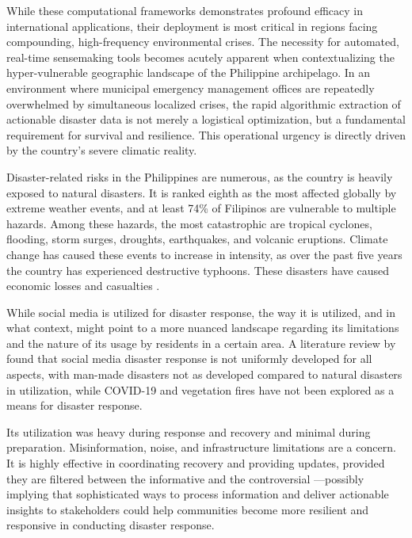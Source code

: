 While these computational frameworks demonstrates profound efficacy in
international applications, their deployment is most critical in regions
facing compounding, high-frequency environmental crises. The necessity for
automated, real-time sensemaking tools becomes acutely apparent when
contextualizing the hyper-vulnerable geographic landscape of the Philippine
archipelago. In an environment where municipal emergency management offices
are repeatedly overwhelmed by simultaneous localized crises, the rapid
algorithmic extraction of actionable disaster data is not merely a logistical
optimization, but a fundamental requirement for survival and resilience. This
operational urgency is directly driven by the country's severe climatic
reality.

Disaster-related risks in the Philippines are numerous, as the country is
heavily exposed to natural disasters. It is ranked eighth as the most affected
globally by extreme weather events, and at least 74\% of
Filipinos are vulnerable to multiple hazards. Among these hazards, the most
catastrophic are tropical cyclones, flooding, storm surges, droughts,
earthquakes, and volcanic eruptions. Climate change has caused these events to
increase in intensity, as over the past five years the country has experienced
destructive typhoons. These disasters have caused economic losses and
casualties \parencite{worldbank2023}.


While social media is utilized for disaster response, the way it is utilized,
and in what context, might point to a more nuanced landscape regarding its
limitations and the nature of its usage by residents in a certain area. A
literature review by \textcite{inferio2025} found that social media disaster
response is not uniformly developed for all aspects, with man-made disasters
not as developed compared to natural disasters in utilization, while COVID-19
and vegetation fires have not been explored as a means for disaster response.

Its utilization was heavy during response and recovery and minimal during preparation. 
Misinformation, noise, and infrastructure limitations are a concern. It is highly effective
in coordinating recovery and providing updates, provided they are filtered
between the informative and the controversial \textcite{inferio2025}---possibly
implying that sophisticated ways to process information and deliver actionable
insights to stakeholders could help communities become more resilient and
responsive in conducting disaster response.

